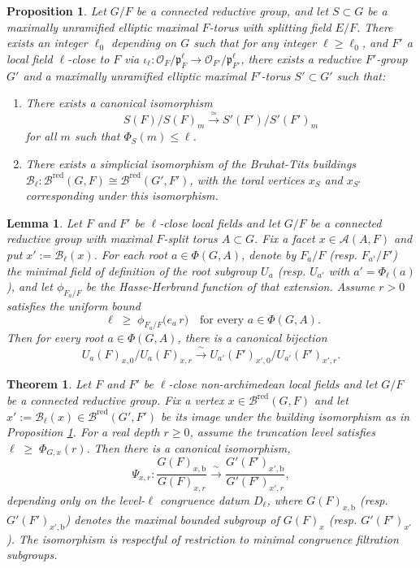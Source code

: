 \documentclass[10pt,a4paper]{amsart}
\newtheorem{theorem}{Theorem}
\newtheorem{proposition}{Proposition}
\newtheorem{lemma}{Lemma}
\begin{document}
\begin{proposition}\label{prop:vertex-transfer} 
Let $G/F$ be a connected reductive group, and let $S \subset G$ be a maximally unramified elliptic maximal $F$-torus with splitting field $E/F$. There exists an integer \( \ell_0 \) depending on \( G\) such that for any integer \(\ell \geq \ell_0 \), and $F'$ a local field $\ell$-close to $F$ via $\iota_\ell: \mathscr{O}_F/\mathfrak{p}_F^\ell \to \mathscr{O}_{F'}/\mathfrak{p}_{F'}^\ell$,  there exists a reductive $F'$-group $G'$ and a maximally unramified elliptic maximal $F'$-torus $S' \subset G'$ such that:
\begin{enumerate}
    \item There exists a canonical isomorphism
    \[
    S(F)/S(F)_m \xrightarrow{\simeq} S'(F')/S'(F')_m
    \]
    for all $m$ such that $\Phi_S(m)\leq \ell$.
    \item There exists a simplicial isomorphism of the Bruhat-Tits buildings $\mathcal{B}_{\ell}:\mathcal{B}^{\mathrm{red}}(G,F)\cong \mathcal{B}^{\mathrm{red}}(G', F')$, with the toral vertices $x_S$ and $x_{S'}$ corresponding under this isomorphism.
\end{enumerate}
\end{proposition}

\begin{lemma}
\label{lem:root-filtration-HH}
Let $F$ and $F'$ be $\ell$-close local fields and let $G/F$ be a connected reductive group with maximal $F$-split torus $A\subset G$. Fix a facet $x\in\mathcal{A}(A,F)$ and put $x':=\mathcal{B}_\ell(x)$. For each root $a\in\Phi(G,A)$, denote by $F_a/F$ (resp. $F_{a'}/F'$) the minimal field of definition of the root subgroup $U_a$ (resp. $U_{a'}$ with $a'=\Phi_\ell(a)$), and let $\phi_{F_a/F}$ be the Hasse-Herbrand function of that extension. Assume $r>0$ satisfies the uniform bound
\[
\; \ell \;\ge\; \phi_{F_a/F}\!\bigl(e_a\,r\bigr) \quad\text{for every }a\in\Phi(G,A). \tag{$\ast$}
\]
Then for every root $a\in\Phi(G,A)$, there is a canonical bijection
\[
  U_a(F)_{x,0}\big/ U_a(F)_{x,r} \xrightarrow{\;\sim\;} U_{a'}(F')_{x',0}\big/ U_{a'}(F')_{x',r}.
\]
\end{lemma}

\begin{theorem}
\label{thm:depth-comp-HH}
Let $F$ and $F'$ be $\ell$-close non-archimedean local fields and let $G/F$ be a connected reductive group. Fix a vertex $x\in\mathcal{B}^{\mathrm{red}}(G,F)$ and let $x':=\mathcal{B}_\ell(x)\in\mathcal{B}^{\mathrm{red}}(G',F')$ be its image under the building isomorphism as in Proposition \ref{prop:vertex-transfer}. For a real depth $r\ge0$, assume the truncation level satisfies
\(
\ell \;\ge\; \Phi_{G,x}(r). 
\) Then there is a canonical  isomorphism,
\[
  \Psi_{x,r}: \dfrac{G(F)_{x,\mathrm{b}}}{G(F)_{x,r}} \xrightarrow{\;\sim\;} \dfrac{G'(F')_{x',\mathrm{b}}}{G'(F')_{x',r}},
\]
depending only on the level-$\ell$ congruence datum $D_\ell$, where \(G(F)_{x,\mathrm{b}}\) (resp. \(G'(F')_{x',\mathrm{b}}\)) denotes the maximal bounded subgroup of \(G(F)_x\) (resp. \(G'(F')_{x'}\)). The isomorphism is respectful of restriction to minimal congruence filtration subgroups.
\end{theorem}
\end{document}
